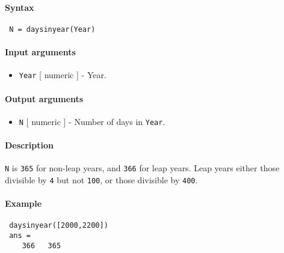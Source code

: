 


	\paragraph{Syntax}
 
 \begin{verbatim}
 N = daysinyear(Year)
 \end{verbatim}
 
 \paragraph{Input arguments}
 
 \begin{itemize}
 \item
   \texttt{Year} {[} numeric {]} - Year.
 \end{itemize}
 
 \paragraph{Output arguments}
 
 \begin{itemize}
 \item
   \texttt{N} {[} numeric {]} - Number of days in \texttt{Year}.
 \end{itemize}
 
 \paragraph{Description}
 
 \texttt{N} is \texttt{365} for non-leap years, and \texttt{366} for leap
 years. Leap years either those divisible by \texttt{4} but not
 \texttt{100}, or those divisible by \texttt{400}.
 
 \paragraph{Example}
 
 \begin{verbatim}
 daysinyear([2000,2200])
 ans =
    366   365
 \end{verbatim}


